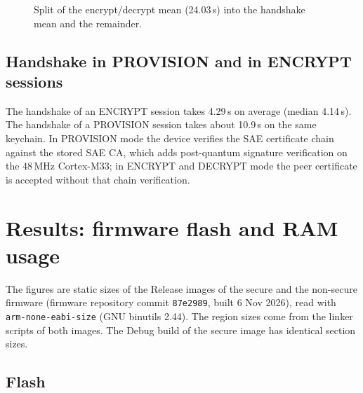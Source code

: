 \documentclass[11pt,a4paper]{report}
\begin{document}
\begin{figure}[htbp]
\centering
{}
\caption{Split of the encrypt/decrypt mean (24.03\,s) into the handshake mean and the remainder.}
\label{fig:split}
\end{figure}

\section{Handshake in PROVISION and in ENCRYPT sessions}

The handshake of an ENCRYPT session takes 4.29\,s on average (median 4.14\,s). The handshake of a PROVISION session takes about 10.9\,s on the same keychain. In PROVISION mode the device verifies the SAE certificate chain against the stored SAE CA, which adds post-quantum signature verification on the 48\,MHz Cortex-M33; in ENCRYPT and DECRYPT mode the peer certificate is accepted without that chain verification.

\chapter{Results: firmware flash and RAM usage}
\label{ch:fw-res}

The figures are static sizes of the Release images of the secure and the non-secure firmware (firmware repository commit \texttt{87e2989}, built 6 Nov 2026), read with \texttt{arm-none-eabi-size} (GNU binutils 2.44). The region sizes come from the linker scripts of both images. The Debug build of the secure image has identical section sizes.

\section{Flash}
\end{document}
